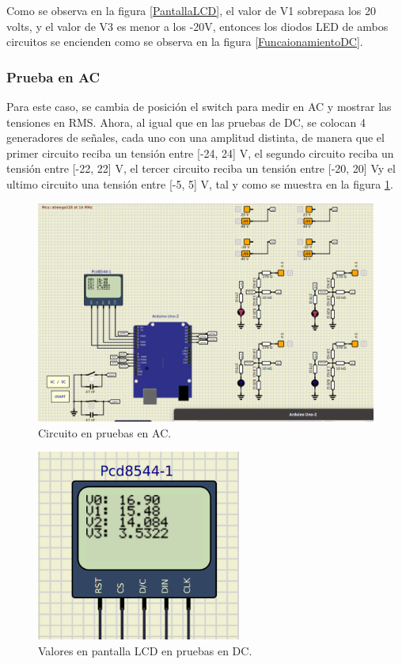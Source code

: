 Como se observa en la figura \ref{PantallaLCD}, el valor de V1 sobrepasa los 20 volts, y el valor de V3 es menor a los -20V, entonces los diodos LED de ambos circuitos se encienden como se observa en la figura \ref{FuncaionamientoDC}.

\subsubsection{Prueba en AC}
Para este caso, se cambia de posición el switch para medir en AC y mostrar las tensiones en RMS. Ahora, al igual que en las pruebas de DC, se colocan 4 generadores de señales, cada uno con una amplitud distinta, de manera que el primer circuito reciba un tensión entre [-24, 24] V, el segundo circuito reciba un tensión entre [-22, 22] V, el tercer circuito reciba un tensión entre [-20, 20] Vy el ultimo circuito una tensión entre [-5, 5] V, tal y como se muestra en la figura \ref{FuncaionamientoAC}.

\begin{figure}[H]
    \centering
    \includegraphics[width=\textwidth]{Imagenes/Funcionamiento_AC.png}
    \caption{Circuito en pruebas en AC.}
    \label{FuncaionamientoAC}
\end{figure}

\begin{figure}[H]
    \centering
    \includegraphics[width=0.6\textwidth]{Imagenes/Valores_pantallaLCD_AC.png}
    \caption{Valores en pantalla LCD en pruebas en DC.}
    \label{PantallaLCD_AC}
\end{figure}

